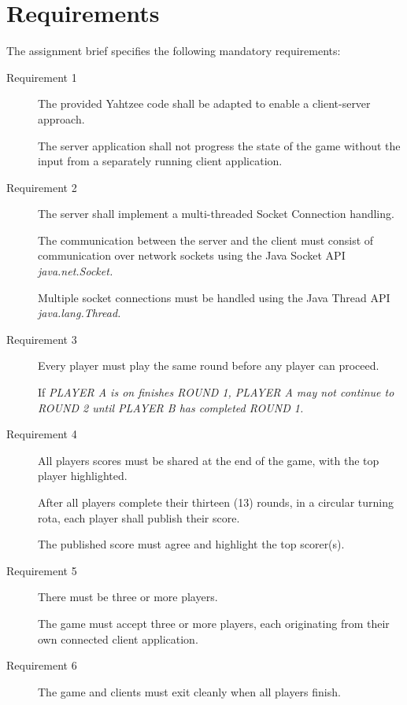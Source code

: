 \section{Requirements}


The assignment brief specifies the following mandatory requirements:

\begin{description}
	\item [Requirement 1] The provided Yahtzee code shall be adapted to enable a client-server approach.
	
	The server application shall not progress the state of the game without the input from a separately running client application.
	
	\item [Requirement 2] The server shall implement a multi-threaded Socket Connection handling.
	
	The communication between the server and the client must consist of communication over network sockets using the Java Socket API \it{java.net.Socket}.
	
	Multiple socket connections must be handled using the Java Thread API \it{java.lang.Thread}.
		
	\item   [Requirement 3] Every player must play the same round before any player can proceed. 
	 
	 If \it{PLAYER A} is on finishes \it{ROUND 1}, \it{PLAYER A} may not continue to \it{ROUND 2} until \it{PLAYER B} has completed \it{ROUND 1}.
	
	\item  [Requirement 4] All players scores must be shared at the end of the game, with the top
	player highlighted.
	
	After all players complete their thirteen (13) rounds, in a circular turning rota, each player shall publish their score.
	
	The published score must agree and highlight the top scorer(s).	
	
	\item  [Requirement 5] There must be three or more players. 
	
	The game must accept three or more players, each originating from their own connected client application.
	
	\item  [Requirement 6] The game and clients must exit cleanly when all players finish.
	

\end{description}
